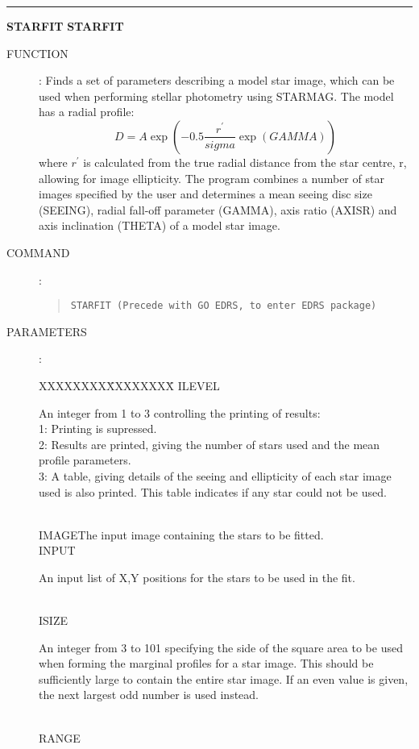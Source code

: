 \goodbreak
\rule{\textwidth}{0.3mm}
{\Large {\bf STARFIT} \hfill {\bf STARFIT}}
\begin{description}
\item [FUNCTION]:
Finds a set of parameters describing a model star image, which can be used
when performing stellar photometry using STARMAG.
The model has a radial profile:
\[D = A \exp (-0.5 \frac{r^{\prime}}{sigma} \exp (GAMMA))\]
where $r^{\prime}$ is calculated from the true radial distance from the star
centre, r, allowing for image ellipticity.
The program combines a number of star images specified by the user and
determines a mean seeing disc size (SEEING), radial fall-off parameter (GAMMA),
axis ratio (AXISR) and axis inclination (THETA) of a model star image.
\item [COMMAND]:
\begin{quote}
{\tt STARFIT   (Precede with GO EDRS, to enter EDRS package)}
\end{quote}
\item [PARAMETERS] :
\begin{tabbing}
XXXXXXXX\=XXXXXXXX\=\kill
ILEVEL\>\begin{minipage}[t]{100mm}
An integer from 1 to 3 controlling the printing of results:\\
1: Printing is supressed.\\
2: Results are printed, giving the number of stars used and the mean profile
parameters.\\
3: A table, giving details of the seeing and ellipticity of each star image
used is also printed.
This table indicates if any star could not be used.
\end{minipage}\\
IMAGE\>\>The input image containing the stars to be fitted.\\
INPUT\>\>\begin{minipage}[t]{100mm}
An input list of X,Y positions for the stars to be used in the fit.
\end{minipage}\\
ISIZE\>\begin{minipage}[t]{100mm}
An integer from 3 to 101 specifying the side of the square area to be used when
forming the marginal profiles for a star image.
This should be sufficiently large to contain the entire star image.
If an even value is given, the next largest odd number is used instead.
\end{minipage}\\
RANGE\>\begin{minipage}[t]{100mm}

\end{minipage}
\end{tabbing}
\end{description}
